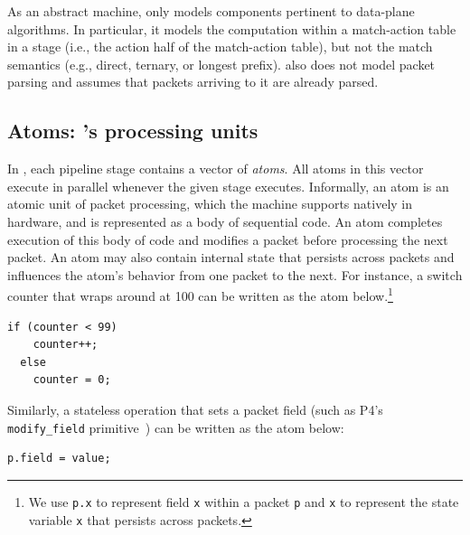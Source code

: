 As an abstract machine, \absmachine only models components pertinent to
data-plane algorithms. In particular, it models the computation within
a match-action table in a stage (i.e., the action half of the match-action
table), but not the match semantics (e.g., direct, ternary, or longest prefix).
\absmachine also does not model packet parsing and assumes that packets
arriving to it are already parsed.


\subsection{Atoms: \absmachine's processing units}

In \absmachine, each pipeline stage contains a vector of \textit{atoms}. All
atoms in this vector execute in parallel whenever the given stage executes.
Informally, an atom is an atomic unit of packet processing, which the
\absmachine machine supports natively in hardware, and is represented as a body
of sequential code. An atom completes execution of this body of code and
modifies a packet before processing the next packet.  An atom
may also contain internal state that persists across packets and influences the
atom's behavior from one packet to the next.  For instance, a switch counter that
wraps around at 100 can be written as the atom below.\footnote{We use {\tt p.x} to represent
  field {\tt x} within a packet {\tt p} and {\tt x} to represent the state
variable {\tt x} that persists across packets.}
  \begin{lstlisting}[style=customc, numbers=none, frame=none]
  if (counter < 99)
    counter++;
  else
    counter = 0;
  \end{lstlisting}
Similarly, a stateless operation that sets a packet field (such as P4's {\tt
modify\_field} primitive~\cite{p4spec}) can be written as the atom below:
\begin{lstlisting}[style=customc, numbers=none, frame=none]
  p.field = value;
\end{lstlisting}

